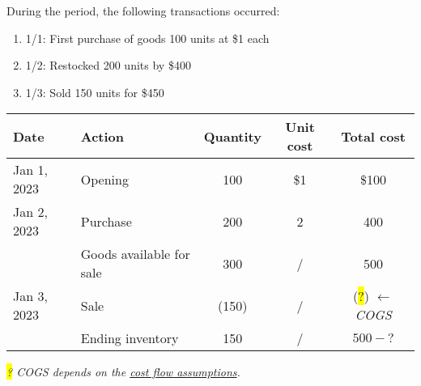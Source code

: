 \small
\begin{tcolorbox}[colframe=black,colback=white,title=Example of inventory cost flow table]
    During the period, the following transactions occurred:
    \begin{enumerate}
        \item 1/1: First purchase of goods 100 units at \$1 each
        \item 1/2: Restocked 200 units by \$400
        \item 1/3: Sold 150 units for \$450
    \end{enumerate}

    \vspace{1em}

    \begin{tabular}{l|l|c|c|c}
        \textbf{Date} & \textbf{Action}          & \textbf{Quantity} & \textbf{Unit cost} & \textbf{Total cost}                               \\
        \hline
        Jan 1, 2023   & Opening                  & 100               & \$1                & \$100                                             \\
        Jan 2, 2023   & Purchase                 & 200               & 2                  & 400                                               \\
        \hline
                      & Goods available for sale & 300               & /                  & 500                                               \\
        Jan 3, 2023   & Sale                     & (150)             & /                  & (\colorbox{yellow}{?}) $\leftarrow$ \textit{COGS} \\
        \hline
                      & Ending inventory         & 150               & /                  & $500-?$                                           \\
    \end{tabular}

    \vspace{1em}

    \textit{\colorbox{yellow}{?} COGS depends on the \hyperref[thm:cost_flow]{cost flow assumptions}.}
\end{tcolorbox}
\normalsize

